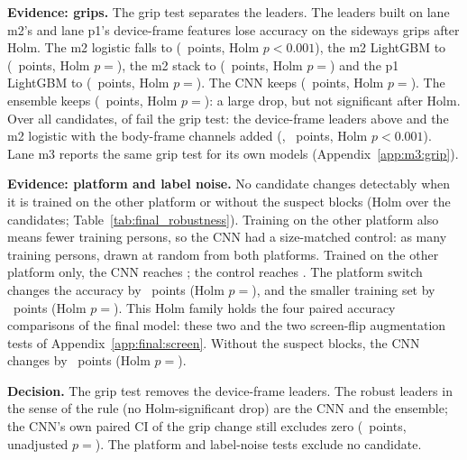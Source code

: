 \textbf{Evidence: grips.}
The grip test separates the leaders.
The leaders built on lane m2's and lane p1's device-frame features lose accuracy on the sideways grips after Holm.
The m2 logistic falls to  (~points, Holm $p < 0.001$), the m2 LightGBM to  (~points, Holm $p = {}$), the m2 stack to  (~points, Holm $p = {}$) and the p1 LightGBM to  (~points, Holm $p = {}$).
The CNN keeps  (~points, Holm $p = {}$).
The ensemble keeps  (~points, Holm $p = {}$): a large drop, but not significant after Holm.
Over all candidates,  of  fail the grip test: the device-frame leaders above and the m2 logistic with the body-frame channels added (, ~points, Holm $p < 0.001$).
Lane m3 reports the same grip test for its own models (Appendix~\ref{app:m3:grip}).

\textbf{Evidence: platform and label noise.}
No candidate changes detectably when it is trained on the other platform or without the suspect blocks (Holm over the candidates; Table~\ref{tab:final_robustness}).
Training on the other platform also means fewer training persons, so the CNN had a size-matched control: as many training persons, drawn at random from both platforms.
Trained on the other platform only, the CNN reaches ; the control reaches .
The platform switch changes the accuracy by ~points (Holm $p = {}$), and the smaller training set by ~points (Holm $p = {}$).
This Holm family holds the four paired accuracy comparisons of the final model: these two and the two screen-flip augmentation tests of Appendix~\ref{app:final:screen}.
Without the suspect blocks, the CNN changes by ~points (Holm $p = {}$).

\textbf{Decision.}
The grip test removes the device-frame leaders.
The robust leaders in the sense of the rule (no Holm-significant drop) are the CNN and the ensemble; the CNN's own paired CI of the grip change still excludes zero (~points, unadjusted $p = {}$).
The platform and label-noise tests exclude no candidate.


